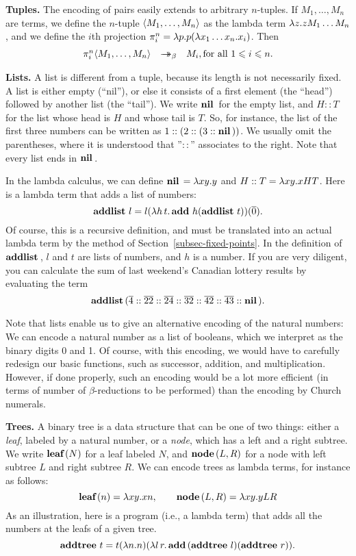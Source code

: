 \documentclass{article}
\begin{document}
{\bf Tuples.} The encoding of pairs easily extends to arbitrary
$n$-tuples. If $M_1,\ldots,M_n$ are terms, we define the $n$-tuple
$\langle M_1,\ldots,M_n\rangle$ as the lambda term $\lambda z.zM_1\ldots M_n$,
and we define the $i$th projection $\pi^n_i=\lambda p.p(\lambda x_1\ldots
x_n.x_i)$. Then
\[ \begin{array}{rcl}
  \pi^n_i\langle M_1,\ldots,M_n\rangle &\mathrel{\rightarrow\!\!\!\!\!\rightarrow}_{\beta}& M_i, \mbox{for all $1\leqslant i\leqslant n$.}
\end{array}
\]

{\bf Lists.} A list is different from a tuple, because its length is
not necessarily fixed. A list is either empty (``nil''), or else it
consists of a first element (the ``head'') followed by another list
(the ``tail''). We write $\mathop{\textbf{\bf nil}\,}$ for the empty list, and $H::T$ for
the list whose head is $H$ and whose tail is $T$. So, for instance,
the list of the first three numbers can be written as
$1::(2::(3::\mathop{\textbf{\bf nil}\,}))$. We usually omit the parentheses, where it is
understood that ''$::$'' associates to the right. Note that every list
ends in $\mathop{\textbf{\bf nil}\,}$.

In the lambda calculus, we can define $\mathop{\textbf{\bf nil}\,}=\lambda xy.y$ and $H::T =
\lambda xy.xHT$. Here is a lambda term that adds a list of numbers:
\[ \mathop{\textbf{\bf addlist}\,} l = l(\lambda h\,t.\mathop{\textbf{\bf add}\,} h(\mathop{\textbf{\bf addlist}\,} t))(\mathop{\overline{0}}).
\]
Of course, this is a recursive definition, and must be translated into
an actual lambda term by the method of Section~\ref{subsec-fixed-points}.
In the definition of $\mathop{\textbf{\bf addlist}\,}$, $l$ and $t$ are lists of numbers,
and $h$ is a number. If you are very diligent, you can calculate the sum of
last weekend's Canadian lottery results by evaluating the term
\[ \mathop{\textbf{\bf addlist}\,} (\mathop{\overline{4}}::\mathop{\overline{22}}::\mathop{\overline{24}}::\mathop{\overline{32}}::\mathop{\overline{42}}::\mathop{\overline{43}}::\mathop{\textbf{\bf nil}\,}).
\]

Note that lists enable us to give an alternative encoding of the
natural numbers: We can encode a natural number as a list of booleans,
which we interpret as the binary digits 0 and 1. Of course, with this
encoding, we would have to carefully redesign our basic functions,
such as successor, addition, and multiplication. However, if done
properly, such an encoding would be a lot more efficient (in terms of
number of $\beta$-reductions to be performed) than the encoding by
Church numerals.

{\bf Trees.} A binary tree is a data structure that can be one of two
things: either a {\em leaf}, labeled by a natural number, or a {\em
  node}, which has a left and a right subtree. We write $\mathop{\textbf{\bf leaf}\,}(N)$ for
a leaf labeled $N$, and $\mathop{\textbf{\bf node}\,}(L,R)$ for a node with left subtree $L$
and right subtree $R$. We can encode trees as lambda terms, for
instance as follows:
\[ \mathop{\textbf{\bf leaf}\,}(n) = \lambda xy.xn,\hspace{2em} \mathop{\textbf{\bf node}\,}(L,R) = \lambda xy.yLR \]
As an illustration, here is a program (i.e., a lambda term) that adds
all the numbers at the leafs of a given tree.
\[ \mathop{\textbf{\bf addtree}\,} t = t(\lambda n.n)(\lambda l\,
r.\mathop{\textbf{\bf add}\,}(\mathop{\textbf{\bf addtree}\,}l)(\mathop{\textbf{\bf addtree}\,}r)).
\]
\end{document}
